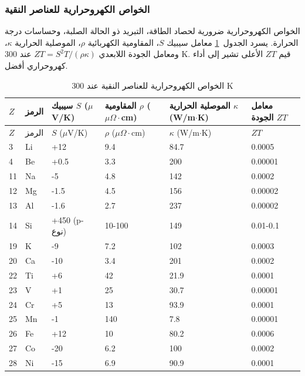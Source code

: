 \documentclass[11pt,a4paper]{article}
\begin{document}
\begin{otherlanguage}{arabic}
		\subsubsection{الخواص الكهروحرارية للعناصر النقية}
		\label{subsec:thermoelectric-properties-func}
		
		الخواص الكهروحرارية ضرورية لحصاد الطاقة، التبريد ذو الحالة الصلبة، وحساسات درجة الحرارة. يسرد الجدول~\ref{tab:thermoelectric-properties-func} معامل سيبيك \(S\)، المقاومية الكهربائية \(\rho\)، الموصلية الحرارية \(\kappa\)، ومعامل الجودة اللابعدي \(ZT = S^2 T / (\rho \kappa)\) عند 300 K. قيم \(ZT\) الأعلى تشير إلى أداء كهروحراري أفضل.
		
		\begin{longtable}{p{0.8cm}p{1.2cm}p{2.2cm}p{2.2cm}p{2.2cm}p{2.2cm}}
			\caption{الخواص الكهروحرارية للعناصر النقية عند 300 K} \label{tab:thermoelectric-properties-func} \\
			\toprule
			\(Z\) & الرمز & سيبيك \(S\) (\(\mu\)V/K) & المقاومية \(\rho\) (\(\mu\Omega\cdot\)cm) & الموصلية الحرارية \(\kappa\) (W/m\(\cdot\)K) & معامل الجودة \(ZT\) \\
			\midrule
			\endfirsthead
			\toprule
			\(Z\) & الرمز & \(S\) (\(\mu\)V/K) & \(\rho\) (\(\mu\Omega\cdot\)cm) & \(\kappa\) (W/m\(\cdot\)K) & \(ZT\) \\
			\midrule
			\endhead
			3  & Li & +12 & 9.4 & 84.7 & 0.0005 \\
			4  & Be & +0.5 & 3.3 & 200 & 0.00001 \\
			11 & Na & -5 & 4.8 & 142 & 0.0002 \\
			12 & Mg & -1.5 & 4.5 & 156 & 0.00002 \\
			13 & Al & -1.6 & 2.7 & 237 & 0.00002 \\
			14 & Si & +450 (p-نوع) & 10-100 & 149 & 0.01-0.1 \\
			19 & K  & -9 & 7.2 & 102 & 0.0003 \\
			20 & Ca & -10 & 3.4 & 201 & 0.0002 \\
			22 & Ti & +6 & 42 & 21.9 & 0.0001 \\
			23 & V  & +1 & 25 & 30.7 & 0.00001 \\
			24 & Cr & +5 & 13 & 93.9 & 0.0001 \\
			25 & Mn & -1 & 140 & 7.8 & 0.00001 \\
			26 & Fe & +12 & 10 & 80.2 & 0.0006 \\
			27 & Co & -20 & 6.2 & 100 & 0.0002 \\
			28 & Ni & -15 & 6.9 & 90.9 & 0.0001 \\

\end{longtable}
\end{otherlanguage}
\end{document}
